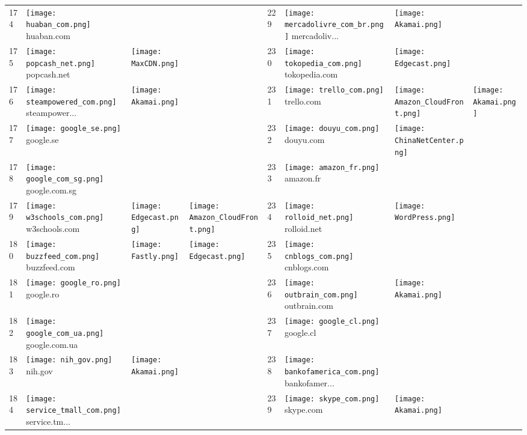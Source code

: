 \begin{table}[]
\begin{tabular}{|llll|llll|}
174 & \texttt{[image: huaban\_com.png]} huaban.com & & & 229 & \texttt{[image: mercadolivre\_com\_br.png]} mercadoliv... & \texttt{[image: Akamai.png]} & \\
175 & \texttt{[image: popcash\_net.png]} popcash.net & \texttt{[image: MaxCDN.png]} & & 230 & \texttt{[image: tokopedia\_com.png]} tokopedia.com & \texttt{[image: Edgecast.png]} & \\
176 & \texttt{[image: steampowered\_com.png]} steampower... & \texttt{[image: Akamai.png]} & & 231 & \texttt{[image: trello\_com.png]} trello.com & \texttt{[image: Amazon\_CloudFront.png]} & \texttt{[image: Akamai.png]} \\
177 & \texttt{[image: google\_se.png]} google.se & & & 232 & \texttt{[image: douyu\_com.png]} douyu.com & \texttt{[image: ChinaNetCenter.png]} & \\
178 & \texttt{[image: google\_com\_sg.png]} google.com.sg & & & 233 & \texttt{[image: amazon\_fr.png]} amazon.fr & & \\
179 & \texttt{[image: w3schools\_com.png]} w3schools.com & \texttt{[image: Edgecast.png]} & \texttt{[image: Amazon\_CloudFront.png]} & 234 & \texttt{[image: rolloid\_net.png]} rolloid.net & \texttt{[image: WordPress.png]} & \\
180 & \texttt{[image: buzzfeed\_com.png]} buzzfeed.com & \texttt{[image: Fastly.png]} & \texttt{[image: Edgecast.png]} & 235 & \texttt{[image: cnblogs\_com.png]} cnblogs.com & & \\
181 & \texttt{[image: google\_ro.png]} google.ro & & & 236 & \texttt{[image: outbrain\_com.png]} outbrain.com & \texttt{[image: Akamai.png]} & \\
182 & \texttt{[image: google\_com\_ua.png]} google.com.ua & & & 237 & \texttt{[image: google\_cl.png]} google.cl & & \\
183 & \texttt{[image: nih\_gov.png]} nih.gov & \texttt{[image: Akamai.png]} & & 238 & \texttt{[image: bankofamerica\_com.png]} bankofamer... & & \\
184 & \texttt{[image: service\_tmall\_com.png]} service.tm... & & & 239 & \texttt{[image: skype\_com.png]} skype.com & \texttt{[image: Akamai.png]} & \\

\end{tabular}
\end{table}
